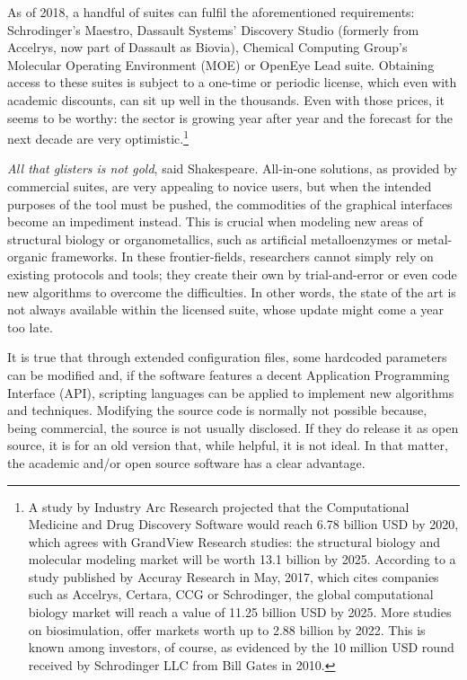 As of 2018, a handful of suites can fulfil the aforementioned requirements: Schrodinger's Maestro,\cite{maestro} Dassault Systems’ Discovery Studio (formerly from Accelrys, now part of Dassault as Biovia),\cite{biovia2017discovery} Chemical Computing Group's Molecular Operating Environment (MOE)\cite{chemical2016molecular} or OpenEye Lead suite.\cite{openeyelead} Obtaining access to these suites is subject to a one-time or periodic license, which even with academic discounts, can sit up well in the thousands. Even with those prices, it seems to be worthy: the sector is growing year after year and the forecast for the next decade are very optimistic.\footnote{A study by Industry Arc Research projected that the Computational Medicine and Drug Discovery Software would reach 6.78 billion USD by 2020,\cite{industryarc} which agrees with GrandView Research studies: the structural biology and molecular modeling market will be worth 13.1 billion by 2025.\cite{grandviewresearch} According to a study published by Accuray Research in May, 2017,\cite{Accuray} which cites companies such as Accelrys, Certara, CCG or Schrodinger, the global computational biology market will reach a value of 11.25 billion USD by 2025. More studies on biosimulation, offer markets worth up to 2.88 billion by 2022.\cite{marketsandmarkets} This is known among investors, of course, as evidenced by the 10 million USD round received by Schrodinger LLC from Bill Gates in 2010.}


\textit{All that glisters is not gold}, said Shakespeare. All-in-one solutions, as provided by commercial suites, are very appealing to novice users, but when the intended purposes of the tool must be pushed, the commodities of the graphical interfaces become an impediment instead. This is crucial when modeling new areas of structural biology or organometallics, such as artificial metalloenzymes or metal-organic frameworks. In these frontier-fields, researchers cannot simply rely on existing protocols and tools; they create their own by trial-and-error or even code new algorithms to overcome the difficulties. In other words, the state of the art is not always available within the licensed suite, whose update might come a year too late.

It is true that through extended configuration files, some hardcoded parameters can be modified and, if the software features a decent Application Programming Interface (API), scripting languages can be applied to implement new algorithms and techniques. Modifying the source code is normally not possible because, being commercial, the source is not usually disclosed. If they do release it as open source, it is for an old version that, while helpful, it is not ideal.\cite{delano2002pymol} In that matter, the academic and/or open source software has a clear advantage.


